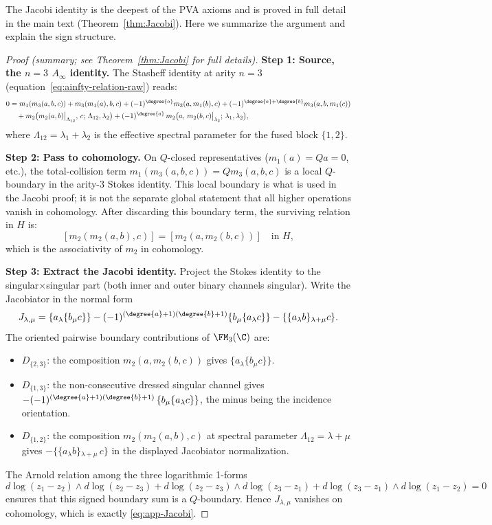 The Jacobi identity is the deepest of the PVA axioms and is proved in full detail in the main text (Theorem~\ref{thm:Jacobi}). Here we summarize the argument and explain the sign structure.

\begin{proof}[Proof (summary; see Theorem~\ref{thm:Jacobi} for full details)]
\textbf{Step 1: Source, the $n=3$ $A_\infty$ identity.}
The Stasheff identity at arity $n=3$ (equation~\eqref{eq:ainfty-relation-raw}) reads:
\begin{align*}
0 &= m_1(m_3(a,b,c)) + m_3(m_1(a),b,c) + (-1)^{\degree{a}}m_3(a,m_1(b),c) + (-1)^{\degree{a}+\degree{b}}m_3(a,b,m_1(c))\\
&\quad + m_2\bigl(m_2(a,b)\big|_{\Lambda_{12}},\, c;\, \Lambda_{12},\lambda_2\bigr) + (-1)^{\degree{a}}\,m_2\bigl(a,\, m_2(b,c)\big|_{\lambda_2};\, \lambda_1, \lambda_2\bigr),
\end{align*}
where $\Lambda_{12} = \lambda_1 + \lambda_2$ is the effective spectral parameter for the fused block $\{1,2\}$.

\textbf{Step 2: Pass to cohomology.}
On $Q$-closed representatives ($m_1(a) = Qa = 0$, etc.), the
total-collision term \(m_1(m_3(a,b,c))=Qm_3(a,b,c)\) is a local
\(Q\)-boundary in the arity-\(3\) Stokes identity.  This local
boundary is what is used in the Jacobi proof; it is not the separate
global statement that all higher operations vanish in cohomology.
After discarding this boundary term, the surviving relation in \(H\)
is:
\[
[m_2(m_2(a,b),c)] = [m_2(a,m_2(b,c))] \quad\text{in }H,
\]
which is the associativity of $m_2$ in cohomology.

\textbf{Step 3: Extract the Jacobi identity.}
Project the Stokes identity to the singular$\times$singular part (both
inner and outer binary channels singular).  Write the Jacobiator in the
normal form
\[
J_{\lambda,\mu}
=
\{a{}_\lambda \{b{}_\mu c\}\}
-
(-1)^{(\degree{a}+1)(\degree{b}+1)}
\{b{}_\mu \{a{}_\lambda c\}\}
-
\{\{a{}_\lambda b\}{}_{\lambda+\mu}c\}.
\]
The oriented pairwise boundary contributions of $\FM_3(\C)$ are:
\begin{itemize}
\item $D_{\{2,3\}}$: the composition $m_2(a,m_2(b,c))$ gives
 $\{a{}_\lambda \{b{}_\mu c\}\}$.
\item $D_{\{1,3\}}$: the non-consecutive dressed singular channel gives
 $-(-1)^{(\degree{a}+1)(\degree{b}+1)}\,\{b{}_\mu \{a{}_\lambda c\}\}$,
 the minus being the incidence orientation.
\item $D_{\{1,2\}}$: the composition $m_2(m_2(a,b),c)$ at spectral
 parameter $\Lambda_{12} = \lambda + \mu$ gives
 $-\{\{a{}_\lambda b\}{}_{\lambda+\mu}\,c\}$ in the displayed
 Jacobiator normalization.
\end{itemize}
The Arnold relation among the three logarithmic 1-forms
\[
d\log(z_1-z_2)\wedge d\log(z_2-z_3) + d\log(z_2-z_3)\wedge d\log(z_3-z_1) + d\log(z_3-z_1)\wedge d\log(z_1-z_2) = 0
\]
ensures that this signed boundary sum is a \(Q\)-boundary.  Hence
\(J_{\lambda,\mu}\) vanishes on cohomology, which is exactly
\eqref{eq:app-Jacobi}.


\end{proof}
